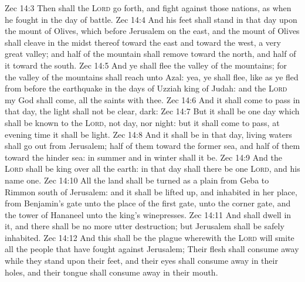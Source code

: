 \vs Zec 14:3 Then shall the \textsc{Lord} go forth, and fight against those nations, as when he fought in the day of battle.
\vs Zec 14:4 And his feet shall stand in that day upon the mount of Olives, which  before Jerusalem on the east, and the mount of Olives shall cleave in the midst thereof toward the east and toward the west,  a very great valley; and half of the mountain shall remove toward the north, and half of it toward the south.
\vs Zec 14:5 And ye shall flee  the valley of the mountains; for the valley of the mountains shall reach unto Azal: yea, ye shall flee, like as ye fled from before the earthquake in the days of Uzziah king of Judah: and the \textsc{Lord} my God shall come,  all the saints with thee.
\vs Zec 14:6 And it shall come to pass in that day,  the light shall not be clear,  dark:
\vs Zec 14:7 But it shall be one day which shall be known to the \textsc{Lord}, not day, nor night: but it shall come to pass,  at evening time it shall be light.
\vs Zec 14:8 And it shall be in that day,  living waters shall go out from Jerusalem; half of them toward the former sea, and half of them toward the hinder sea: in summer and in winter shall it be.
\vs Zec 14:9 And the \textsc{Lord} shall be king over all the earth: in that day shall there be one \textsc{Lord}, and his name one.
\vs Zec 14:10 All the land shall be turned as a plain from Geba to Rimmon south of Jerusalem: and it shall be lifted up, and inhabited in her place, from Benjamin's gate unto the place of the first gate, unto the corner gate, and  the tower of Hananeel unto the king's winepresses.
\vs Zec 14:11 And  shall dwell in it, and there shall be no more utter destruction; but Jerusalem shall be safely inhabited.
\vs Zec 14:12 And this shall be the plague wherewith the \textsc{Lord} will smite all the people that have fought against Jerusalem; Their flesh shall consume away while they stand upon their feet, and their eyes shall consume away in their holes, and their tongue shall consume away in their mouth.
